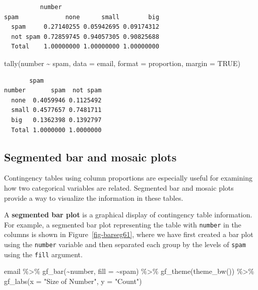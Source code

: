 \documentclass[
  letterpaper,
  DIV=11,
  numbers=noendperiod]{scrreprt}
\newenvironment{Shaded}{\begin{snugshade}}{\end{snugshade}}
\newcommand{\AttributeTok}[1]{\textcolor[rgb]{0.40,0.45,0.13}{#1}}
\newcommand{\ConstantTok}[1]{\textcolor[rgb]{0.56,0.35,0.01}{#1}}
\newcommand{\FunctionTok}[1]{\textcolor[rgb]{0.28,0.35,0.67}{#1}}
\newcommand{\NormalTok}[1]{\textcolor[rgb]{0.00,0.23,0.31}{#1}}
\newcommand{\SpecialCharTok}[1]{\textcolor[rgb]{0.37,0.37,0.37}{#1}}
\newcommand{\StringTok}[1]{\textcolor[rgb]{0.13,0.47,0.30}{#1}}
\begin{document}
\begin{verbatim}
          number
spam             none      small        big
  spam     0.27140255 0.05942695 0.09174312
  not spam 0.72859745 0.94057305 0.90825688
  Total    1.00000000 1.00000000 1.00000000
\end{verbatim}

\begin{Shaded}
\begin{Highlighting}[]
\FunctionTok{tally}\NormalTok{(number }\SpecialCharTok{\textasciitilde{}}\NormalTok{ spam, }\AttributeTok{data =}\NormalTok{ email, }\AttributeTok{format =} \StringTok{\textquotesingle{}proportion\textquotesingle{}}\NormalTok{, }\AttributeTok{margin =} \ConstantTok{TRUE}\NormalTok{)}
\end{Highlighting}
\end{Shaded}

\begin{verbatim}
       spam
number       spam  not spam
  none  0.4059946 0.1125492
  small 0.4577657 0.7481711
  big   0.1362398 0.1392797
  Total 1.0000000 1.0000000
\end{verbatim}

\subsection{Segmented bar and mosaic
plots}\label{segmented-bar-and-mosaic-plots}

Contingency tables using column proportions are especially useful for
examining how two categorical variables are related. Segmented bar and
mosaic plots provide a way to visualize the information in these tables.

A \textbf{segmented bar plot} is a graphical display of contingency
table information. For example, a segmented bar plot representing the
table with \texttt{number} in the columns is shown in
Figure~\ref{fig-barseg61}, where we have first created a bar plot using
the \texttt{number} variable and then separated each group by the levels
of \texttt{spam} using the \texttt{fill} argument.

\begin{Shaded}
\begin{Highlighting}[]
\NormalTok{email }\SpecialCharTok{\%\textgreater{}\%}
  \FunctionTok{gf\_bar}\NormalTok{(}\SpecialCharTok{\textasciitilde{}}\NormalTok{number, }\AttributeTok{fill =} \SpecialCharTok{\textasciitilde{}}\NormalTok{spam) }\SpecialCharTok{\%\textgreater{}\%}
  \FunctionTok{gf\_theme}\NormalTok{(}\FunctionTok{theme\_bw}\NormalTok{()) }\SpecialCharTok{\%\textgreater{}\%}
  \FunctionTok{gf\_labs}\NormalTok{(}\AttributeTok{x =} \StringTok{"Size of Number"}\NormalTok{, }\AttributeTok{y =} \StringTok{"Count"}\NormalTok{)}
\end{Highlighting}
\end{Shaded}
\end{document}
